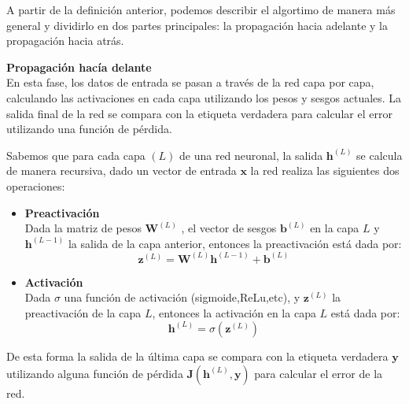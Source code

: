 A partir de la definición anterior, podemos describir el algortimo de manera más general y dividirlo en dos partes principales: la propagación hacia adelante y la propagación hacia atrás.

\noindent \textbf{Propagación hacía delante}\\
En esta fase, los datos de entrada se pasan a través de la red capa por capa, calculando las activaciones en cada capa utilizando los pesos y sesgos actuales. La salida final de la red se compara con la etiqueta verdadera para calcular el error utilizando una función de pérdida.

Sabemos que para cada capa $(L)$ de una red neuronal, la salida $\mathbf{h}^{(L)}$ se calcula de manera recursiva, dado un vector de entrada $\mathbf{x}$ la red realiza las siguientes dos operaciones:

\begin{itemize}
    \item \textbf{Preactivación} \\
          Dada la matriz de pesos $\mathbf{W}^{(L)}$ , el vector de sesgos $\mathbf{b}^{(L)}$ en la capa $L$ y $\mathbf{h}^{(L-1)}$ la salida de la capa anterior, entonces la preactivación está dada por:
          \[
              \mathbf{z}^{(L)} = \mathbf{W}^{(L)}\mathbf{h}^{(L-1)} + \mathbf{b}^{(L)}
          \]
    \item \textbf{Activación}\\
          Dada $\sigma$ una función de activación (sigmoide,ReLu,etc), y $\mathbf{z}^{(L)}$ la preactivación de la capa $L$, entonces la activación en la capa $L$ está dada por:
          \[
              \mathbf{h}^{(L)} = \sigma \left( \mathbf{z}^{(L)} \right)
          \]
\end{itemize}
De esta forma la salida de la última capa se compara con la etiqueta verdadera $\mathbf{y}$ utilizando alguna función de pérdida $\mathbf{J}(\mathbf{h}^{(L)},\mathbf{y})$ para calcular el error de la red.


